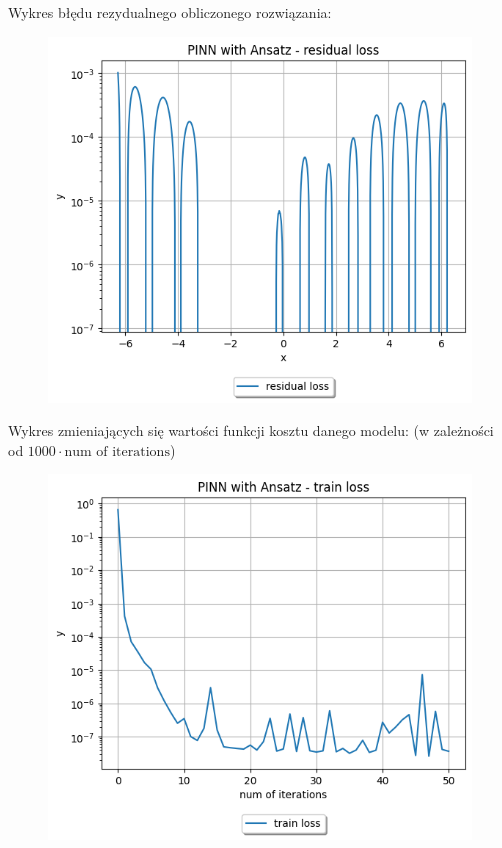 \documentclass{article}
\begin{document}
Wykres błędu rezydualnego obliczonego rozwiązania:\\

\begin{figure}[H]
  \includegraphics[width=\linewidth]{figures/1_ans_residual.png}
\end{figure}

Wykres zmieniających się wartości funkcji kosztu danego modelu:
(w zależności od $1000 \cdot \text{num of iterations}$)\\

\begin{figure}[H]
  \includegraphics[width=\linewidth]{figures/1_ans_train.png}
\end{figure}
\end{document}
